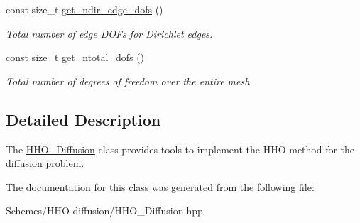 \begin{DoxyCompactItemize}
\mbox{\label{classHArDCore2D_1_1HHO__Diffusion_a1bd1705bbdc60336d3f9f62412b7d54e}} 
const size\+\_\+t \hyperlink{classHArDCore2D_1_1HHO__Diffusion_a1bd1705bbdc60336d3f9f62412b7d54e}{get\+\_\+ndir\+\_\+edge\+\_\+dofs} ()
\begin{DoxyCompactList}\small\item\em Total number of edge D\+O\+Fs for Dirichlet edges. \end{DoxyCompactList}\item 
\mbox{\label{classHArDCore2D_1_1HHO__Diffusion_a83730cd62e94ef4736562d77c4f3dc5e}} 
const size\+\_\+t \hyperlink{classHArDCore2D_1_1HHO__Diffusion_a83730cd62e94ef4736562d77c4f3dc5e}{get\+\_\+ntotal\+\_\+dofs} ()
\begin{DoxyCompactList}\small\item\em Total number of degrees of freedom over the entire mesh. \end{DoxyCompactList}\end{DoxyCompactItemize}


\subsection{Detailed Description}
The \hyperlink{classHArDCore2D_1_1HHO__Diffusion}{H\+H\+O\+\_\+\+Diffusion} class provides tools to implement the H\+HO method for the diffusion problem. 

The documentation for this class was generated from the following file\+:\begin{DoxyCompactItemize}
\item 
Schemes/\+H\+H\+O-\/diffusion/H\+H\+O\+\_\+\+Diffusion.\+hpp\end{DoxyCompactItemize}
